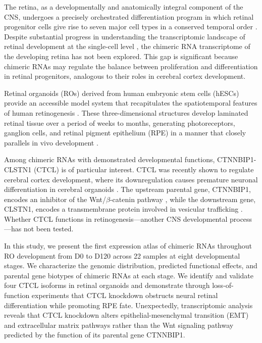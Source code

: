 \documentclass[11pt]{article}
\begin{document}
The retina, as a developmentally and anatomically integral component of the CNS, undergoes a precisely orchestrated differentiation program in which retinal progenitor cells give rise to seven major cell types in a conserved temporal order \citep{cepko2014retinal}. Despite substantial progress in understanding the transcriptomic landscape of retinal development at the single-cell level \citep{cowan2020cell, macosko2015highly}, the chimeric RNA transcriptome of the developing retina has not been explored. This gap is significant because chimeric RNAs may regulate the balance between proliferation and differentiation in retinal progenitors, analogous to their roles in cerebral cortex development.

Retinal organoids (ROs) derived from human embryonic stem cells (hESCs) provide an accessible model system that recapitulates the spatiotemporal features of human retinogenesis \citep{nakano2012retinal, zhong2014generation, reichman2017generation}. These three-dimensional structures develop laminated retinal tissue over a period of weeks to months, generating photoreceptors, ganglion cells, and retinal pigment epithelium (RPE) in a manner that closely parallels in vivo development \citep{yue2021retinal_organoid, kallman2020retinal}.

Among chimeric RNAs with demonstrated developmental functions, CTNNBIP1-CLSTN1 (CTCL) is of particular interest. CTCL was recently shown to regulate cerebral cortex development, where its downregulation causes premature neuronal differentiation in cerebral organoids \citep{gao2022ctcl}. The upstream parental gene, CTNNBIP1, encodes an inhibitor of the Wnt/\(\beta\)-catenin pathway \citep{zhou2016wnt}, while the downstream gene, CLSTN1, encodes a transmembrane protein involved in vesicular trafficking \citep{adijanto2014src}. Whether CTCL functions in retinogenesis---another CNS developmental process---has not been tested.

In this study, we present the first expression atlas of chimeric RNAs throughout RO development from D0 to D120 across 22 samples at eight developmental stages. We characterize the genomic distribution, predicted functional effects, and parental gene biotypes of chimeric RNAs at each stage. We identify and validate four CTCL isoforms in retinal organoids and demonstrate through loss-of-function experiments that CTCL knockdown obstructs neural retinal differentiation while promoting RPE fate. Unexpectedly, transcriptomic analysis reveals that CTCL knockdown alters epithelial-mesenchymal transition (EMT) and extracellular matrix pathways rather than the Wnt signaling pathway predicted by the function of its parental gene CTNNBIP1.
\end{document}
